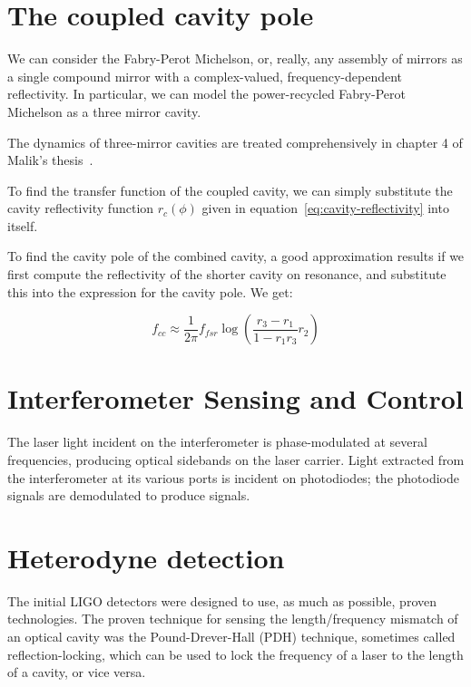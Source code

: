 \section{The coupled cavity pole}

We can consider the Fabry-Perot Michelson, or, really, any assembly of
mirrors as a single compound mirror with a complex-valued,
frequency-dependent reflectivity.  In particular, we can model the
power-recycled Fabry-Perot Michelson as a three mirror cavity.

The dynamics of three-mirror cavities are treated comprehensively in
chapter 4 of Malik's thesis~\cite{Rakhmanov2000Dynamics}.

To find the transfer function of the coupled cavity, we can simply
substitute the cavity reflectivity function $r_c(\phi)$ given in
equation~\ref{eq:cavity-reflectivity} into itself.  

To find the cavity pole of the combined cavity, a good approximation
results if we first compute the reflectivity of the shorter cavity on
resonance, and substitute this into the expression for the cavity pole.
We get:

\begin{equation}
f_{cc} \approx \frac{1}{2\pi} f_{fsr} \log \left(\frac{r_3 - r_1}{1 - r_1 r_3} r_2\right)
\end{equation}



\section{Interferometer Sensing and Control}
\label{sec:isc}
The laser light incident on the interferometer is phase-modulated at
several frequencies, producing optical sidebands on the laser carrier.
Light extracted from the interferometer at its various ports is
incident on photodiodes; the photodiode signals are demodulated to
produce signals.

\cite{Fritschel2001Readout}


\section{Heterodyne detection}

The initial LIGO detectors were designed to use, as much as possible,
proven technologies.  The proven technique for sensing the
length/frequency mismatch of an optical cavity was the
Pound-Drever-Hall (PDH)
technique\cite{Drever1983Laser,Black2001Introduction}, sometimes
called reflection-locking, which can be used to lock the frequency of
a laser to the length of a cavity, or vice versa.


